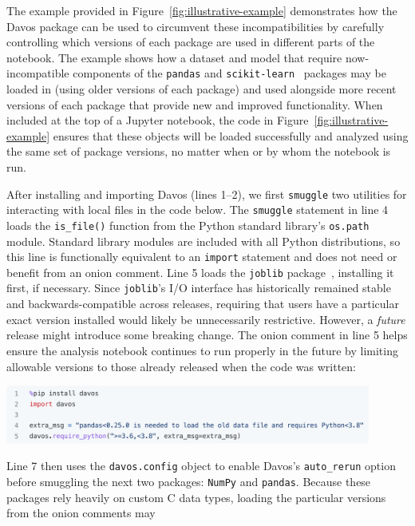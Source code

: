 \documentclass[preprint,12pt,a4paper]{elsarticle}
\begin{document}
The example provided in Figure~\ref{fig:illustrative-example} demonstrates how
the Davos package can be used to circumvent these incompatibilities by
carefully controlling which versions of each package are used in different
parts of the notebook. The example shows how a dataset and model that require
now-incompatible components of the \texttt{pandas} and
\texttt{scikit-learn}~\cite{PedrEtal11} packages may be loaded in (using older
versions of each package) and used alongside more recent versions of each
package that provide new and improved functionality. When included at the top
of a Jupyter notebook, the code in Figure~\ref{fig:illustrative-example}
ensures that these objects will be loaded successfully and analyzed using the
same set of package versions, no matter when or by whom the notebook is run.

After installing and importing Davos (lines 1--2), we first \texttt{smuggle} two
utilities for interacting with local files in the code below. The
\texttt{smuggle} statement in line 4 loads the \texttt{is\_file()}
function from the Python standard library's \texttt{os.path}
module. Standard library modules are included with all Python
distributions, so this line is functionally equivalent to an
\texttt{import} statement and does not need or benefit from an onion
comment. Line 5 loads the \texttt{joblib} package~\cite{Varo10},
installing it first, if necessary. Since \texttt{joblib}'s I/O
interface has historically remained stable and backwards-compatible
across releases, requiring that users have a particular exact version
installed would likely be unnecessarily restrictive. However, a
\textit{future} release might introduce some breaking change.  The
onion comment in line 5 helps ensure the analysis notebook continues
to run properly in the future by limiting allowable versions to those
already released when the code was written:
\begin{center}
\includegraphics[width=0.9\textwidth]{figs/example1}
\end{center}
Line 7 then uses the \texttt{davos.config} object to enable
Davos's \texttt{auto\_rerun} option before smuggling the next
two packages: \texttt{NumPy} and
\texttt{pandas}. Because these packages rely heavily on custom C data
types, loading the particular versions from the onion comments may
\end{document}

